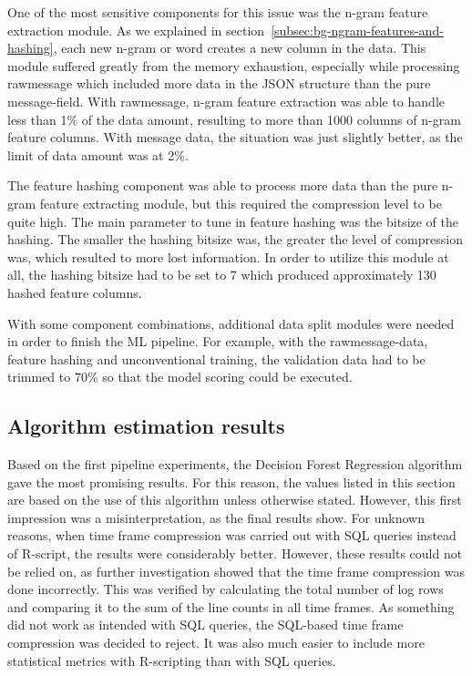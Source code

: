 One of the most sensitive components for this issue
was the n-gram feature extraction module.
As we explained in section~\ref{subsec:bg-ngram-features-and-hashing},
each new n-gram or word creates a new column in the data.
This module suffered greatly from the memory exhaustion,
especially while processing rawmessage
which included more data in the JSON structure than the pure message-field.
With rawmessage,
n-gram feature extraction was able to handle
less than 1\% of the data amount,
resulting to more than 1000 columns of n-gram feature columns.
With message data,
the situation was just slightly better,
as the limit of data amount was at 2\%.

The feature hashing component was able to process more data than the pure n-gram feature extracting module,
but this required the compression level to be quite high.
The main parameter to tune in feature hashing was the bitsize of the hashing.
The smaller the hashing bitsize was,
the greater the level of compression was,
which resulted to more lost information.
In order to utilize this module at all,
the hashing bitsize had to be set to 7
which produced approximately 130 hashed feature columns.

With some component combinations,
additional data split modules were needed
in order to finish the ML pipeline.
For example,
with the rawmessage-data, feature hashing and unconventional training,
the validation data had to be trimmed to 70\%
so that the model scoring could be executed.



\subsection{Algorithm estimation results}\label{subsec:res-algorithm-estimation-results}

Based on the first pipeline experiments,
the Decision Forest Regression algorithm gave the most promising results.
For this reason,
the values listed in this section are based on the use of this algorithm unless otherwise stated.
However, this first impression was a misinterpretation,
as the final results show.
For unknown reasons,
when time frame compression was carried out with SQL queries instead of R-script,
the results were considerably better.
However, these results could not be relied on,
as further investigation showed that the time frame compression was done incorrectly.
This was verified by calculating the total number of log rows
and comparing it to the sum of the line counts in all time frames.
As something did not work as intended with SQL queries,
the SQL-based time frame compression was decided to reject.
It was also much easier to include more statistical metrics
with R-scripting than with SQL queries.

